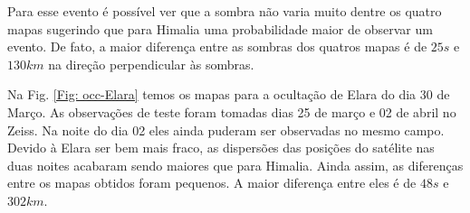 \documentclass[12pt,a4paper]{monografia}
\begin{document}
\begin{figure}
\begin{centering}
\label{Fig: occ-Himalia}
\end{centering}
\end{figure}

Para esse evento é possível ver que a sombra não varia muito dentre os quatro mapas sugerindo que para Himalia uma probabilidade maior de observar um evento. De fato, a maior diferença entre as sombras dos quatros mapas é de $25 s$ e $130 km$ na direção perpendicular às sombras.

Na Fig. \ref{Fig: occ-Elara} temos os mapas para a ocultação de Elara do dia 30 de Março. As observações de teste foram tomadas dias 25 de março e 02 de abril no Zeiss. Na noite do dia 02 eles ainda puderam ser observadas no mesmo campo. Devido à Elara ser bem mais fraco, as dispersões das posições do satélite nas duas noites acabaram sendo maiores que para Himalia. Ainda assim, as diferenças entre os mapas obtidos foram pequenos. A maior diferença entre eles é de $48 s$ e $302 km$.
\end{document}

